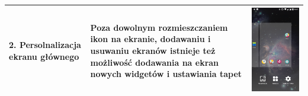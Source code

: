 \documentclass[12pt]{article}
\begin{document}
\begin{longtable}{|p{}|p{}|p{}|}
        \hline
        2. Persolnalizacja ekranu głównego & Poza dowolnym rozmieszczaniem ikon na ekranie, dodawaniu i usuwaniu ekranów istnieje też możliwość dodawania na ekran nowych widgetów i ustawiania tapet & \includegraphics[scale=0.1]{changedesktop.png}\\
        \hline

\end{longtable}
\end{document}
